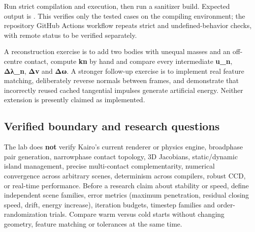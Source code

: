 Run strict compilation and execution, then run a sanitizer build. Expected output is . This verifies only the tested cases on the compiling environment; the repository GitHub Actions workflow repeats strict and undefined-behavior checks, with remote status to be verified separately.

A reconstruction exercise is to add two bodies with unequal masses and an off-centre contact, compute \textbf{kn} by hand and compare every intermediate \textbf{u\_n}, \textbf{Δλ\_n}, \textbf{Δv} and \textbf{Δω}. A stronger follow-up exercise is to implement real feature matching, deliberately reverse normals between frames, and demonstrate that incorrectly reused cached tangential impulses generate artificial energy. Neither extension is presently claimed as implemented.

\subsection{Verified boundary and research questions}\label{appendix-c9d92e145503-verified-boundary-and-research-questions}

\hypertarget{appendix-c9d92e145503-verified-boundary-and-research-questions}{}

The lab does \textbf{not} verify Kairo's current renderer or physics engine, broadphase pair generation, narrowphase contact topology, 3D Jacobians, static/dynamic island management, precise multi-contact complementarity, numerical convergence across arbitrary scenes, determinism across compilers, robust CCD, or real-time performance. Before a research claim about stability or speed, define independent scene families, error metrics (maximum penetration, residual closing speed, drift, energy increase), iteration budgets, timestep families and order-randomization trials. Compare warm versus cold starts without changing geometry, feature matching or tolerances at the same time.
